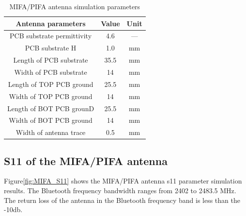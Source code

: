 \begin{table}[h]
	\centering
	\begin{tabular}{|c|c|c| }
		\hline 
		\textbf{Antenna parameters} & \textbf{Value} & \textbf{Unit} \\ 
		\hline
		PCB substrate permittivity & 4.6 & — \\
		\hline
		PCB substrate H & 1.0 & mm \\
		\hline
		Length of PCB substrate & 35.5 &mm\\
		\hline
		Width of PCB substrate &14 &mm\\
		\hline
		Length of TOP PCB ground & 25.5& mm\\
		\hline
		Width of TOP PCB ground& 14& mm\\
		\hline
		Length of BOT PCB grounD &25.5 &mm\\
		\hline
		Width of BOT PCB ground &14 &mm\\
		\hline
		Width of antenna trace &0.5 &mm\\
		\hline
	\end{tabular}
	\caption{MIFA/PIFA antenna simulation parameters \cite{NXP_AN11994_Antenna_Guide}}
	\label{tb:MIFA_ANTENNA_SIMULATION_PARAMETERS}
\end{table}

\subsection{S11 of the MIFA/PIFA antenna}
Figure\ref{fig:MIFA_S11} shows the MIFA/PIFA antenna s11 parameter simulation results. The Bluetooth frequency bandwidth ranges from 2402 to 2483.5 MHz. The return loss of the antenna in the Bluetooth frequency band is less than the -10db.

